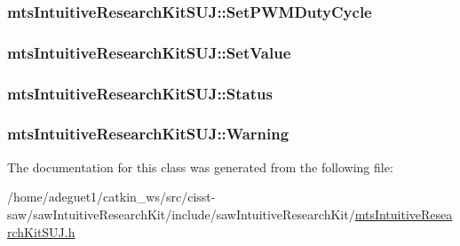 \hypertarget{classmts_intuitive_research_kit_s_u_j_a0890ef11a70c40b4de112920950be4d0}{
\subsubsection[{Set\-P\-W\-M\-Duty\-Cycle}]{ mts\-Intuitive\-Research\-Kit\-S\-U\-J\-::\-Set\-P\-W\-M\-Duty\-Cycle}}\label{classmts_intuitive_research_kit_s_u_j_a0890ef11a70c40b4de112920950be4d0}
\hypertarget{classmts_intuitive_research_kit_s_u_j_acb13bb51445c7e3489b87632b0ef1b2a}{
\subsubsection[{Set\-Value}]{ mts\-Intuitive\-Research\-Kit\-S\-U\-J\-::\-Set\-Value}}\label{classmts_intuitive_research_kit_s_u_j_acb13bb51445c7e3489b87632b0ef1b2a}
\hypertarget{classmts_intuitive_research_kit_s_u_j_a35450db73924ff02abc887bd597c29d7}{
\subsubsection[{Status}]{ mts\-Intuitive\-Research\-Kit\-S\-U\-J\-::\-Status}}\label{classmts_intuitive_research_kit_s_u_j_a35450db73924ff02abc887bd597c29d7}
\hypertarget{classmts_intuitive_research_kit_s_u_j_aec08aca97c788326bc927601d98710fd}{
\subsubsection[{Warning}]{ mts\-Intuitive\-Research\-Kit\-S\-U\-J\-::\-Warning}}\label{classmts_intuitive_research_kit_s_u_j_aec08aca97c788326bc927601d98710fd}


The documentation for this class was generated from the following file\-:\begin{DoxyCompactItemize}
\item 
/home/adeguet1/catkin\-\_\-ws/src/cisst-\/saw/saw\-Intuitive\-Research\-Kit/include/saw\-Intuitive\-Research\-Kit/\hyperlink{mts_intuitive_research_kit_s_u_j_8h}{mts\-Intuitive\-Research\-Kit\-S\-U\-J.\-h}\end{DoxyCompactItemize}
